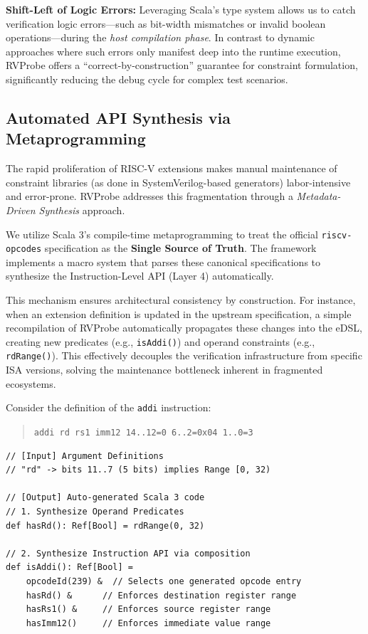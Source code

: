 \documentclass[sigconf]{acmart}
\begin{document}
\textbf{Shift-Left of Logic Errors:}
Leveraging Scala's type system allows us to catch verification logic errors—such as bit-width mismatches or invalid boolean operations—during the \textit{host compilation phase}. In contrast to dynamic approaches where such errors only manifest deep into the runtime execution, RVProbe offers a ``correct-by-construction'' guarantee for constraint formulation, significantly reducing the debug cycle for complex test scenarios.

\subsection{Automated API Synthesis via Metaprogramming}\label{Sec3.4}

The rapid proliferation of RISC-V extensions makes manual maintenance of constraint libraries (as done in SystemVerilog-based generators) labor-intensive and error-prone. RVProbe addresses this fragmentation through a \textit{Metadata-Driven Synthesis} approach.

We utilize Scala 3's compile-time metaprogramming to treat the official \texttt{riscv-opcodes} specification as the \textbf{Single Source of Truth}. The framework implements a macro system that parses these canonical specifications to synthesize the Instruction-Level API (Layer 4) automatically. 

This mechanism ensures architectural consistency by construction. For instance, when an extension definition is updated in the upstream specification, a simple recompilation of RVProbe automatically propagates these changes into the eDSL, creating new predicates (e.g., \texttt{isAddi()}) and operand constraints (e.g., \texttt{rdRange()}). This effectively decouples the verification infrastructure from specific ISA versions, solving the maintenance bottleneck inherent in fragmented ecosystems.

Consider the definition of the \texttt{addi} instruction:
\begin{quote}
\texttt{addi rd rs1 imm12 14..12=0 6..2=0x04 1..0=3}
\end{quote}

\begin{lstlisting}[caption={Transformation from Metadata to eDSL API}, label=code:macro_example]
// [Input] Argument Definitions
// "rd" -> bits 11..7 (5 bits) implies Range [0, 32)

// [Output] Auto-generated Scala 3 code
// 1. Synthesize Operand Predicates
def hasRd(): Ref[Bool] = rdRange(0, 32)

// 2. Synthesize Instruction API via composition
def isAddi(): Ref[Bool] =
    opcodeId(239) &  // Selects one generated opcode entry
    hasRd() &      // Enforces destination register range
    hasRs1() &     // Enforces source register range
    hasImm12()     // Enforces immediate value range
\end{lstlisting}
\end{document}
